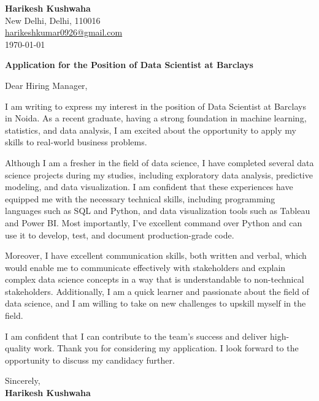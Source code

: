 \documentclass{letter}
\begin{document}
\begin{flushleft}
    \textbf{Harikesh Kushwaha}\\
    New Delhi, Delhi, 110016\\
    \href{mailto:harikeshkumar0926@gmail.com}{harikeshkumar0926@gmail.com}\\
    \today
\end{flushleft}

\begin{center}
    \textbf{Application for the Position of Data Scientist at Barclays}
\end{center}

Dear Hiring Manager,

I am writing to express my interest in the position of Data Scientist at Barclays in Noida. As a recent graduate, having a strong foundation in machine learning, statistics, and data analysis, I am excited about the opportunity to apply my skills to real-world business problems.

Although I am a fresher in the field of data science, I have completed several data science projects during my studies, including exploratory data analysis, predictive modeling, and data visualization. I am confident that these experiences have equipped me with the necessary technical skills, including programming languages such as SQL and Python, and data visualization tools such as Tableau and Power BI. Most importantly, I've excellent command over Python and can use it to develop, test, and document production-grade code.

Moreover, I have excellent communication skills, both written and verbal, which would enable me to communicate effectively with stakeholders and explain complex data science concepts in a way that is understandable to non-technical stakeholders. Additionally, I am a quick learner and passionate about the field of data science, and I am willing to take on new challenges to upskill myself in the field.

I am confident that I can contribute to the team's success and deliver high-quality work. Thank you for considering my application. I look forward to the opportunity to discuss my candidacy further.


Sincerely,\\
\textbf{Harikesh Kushwaha}
\end{document}
